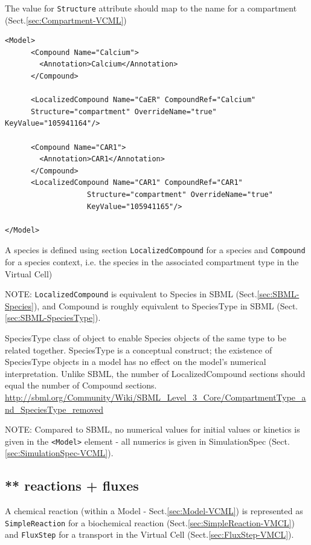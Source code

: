 The value for \verb!Structure! attribute should map to the name for a
compartment (Sect.\ref{sec:Compartment-VCML})
\begin{verbatim}
<Model>
      <Compound Name="Calcium">
        <Annotation>Calcium</Annotation>
      </Compound>
      
      <LocalizedCompound Name="CaER" CompoundRef="Calcium"
      Structure="compartment" OverrideName="true" KeyValue="105941164"/>
       
      <Compound Name="CAR1">
        <Annotation>CAR1</Annotation>
      </Compound>
      <LocalizedCompound Name="CAR1" CompoundRef="CAR1" 
                   Structure="compartment" OverrideName="true"
                   KeyValue="105941165"/>
            
</Model>      
\end{verbatim}

A species is defined using section \verb!LocalizedCompound! for a species and
\verb!Compound! for a species context, i.e. the species in the associated
compartment type in the Virtual Cell)

NOTE: \verb!LocalizedCompound! is equivalent to Species in SBML
(Sect.\ref{sec:SBML-Species}), and Compound is roughly equivalent to SpeciesType
in SBML (Sect.\ref{sec:SBML-SpeciesType}). 

SpeciesType class of object to enable Species objects of the same type to be
related together. SpeciesType is a conceptual construct; the existence of
SpeciesType objects in a model has no effect on the model's numerical
interpretation. Unlike SBML, the number of LocalizedCompound sections should
equal the number of Compound sections.
 \url{http://sbml.org/Community/Wiki/SBML_Level_3_Core/CompartmentType_and_SpeciesType_removed}
  
NOTE: Compared to SBML, no numerical values for initial values or kinetics is
given in the \verb!<Model>! element - all numerics is given in SimulationSpec
(Sect.\ref{sec:SimulationSpec-VCML}).

\subsection{** reactions + fluxes}
\label{sec:reaction-VCML}  
\label{sec:flux-VCML}  

A chemical reaction (within a Model - Sect.\ref{sec:Model-VCML}) is represented
as \verb!SimpleReaction! for a biochemical reaction
(Sect.\ref{sec:SimpleReaction-VMCL}) and \verb!FluxStep! for a transport in the
Virtual Cell (Sect.\ref{sec:FluxStep-VMCL}).

